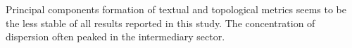 																																																																																																																																																																																																																																																																																																																																																																																																				Principal components formation of textual and topological metrics
																																																																																																																																																																																																																																																																																																																																																																																																				seems to be the less stable of all results reported in this study.
																																																																																																																																																																																																																																																																																																																																																																																																				The concentration of dispersion often peaked in the intermediary sector.
